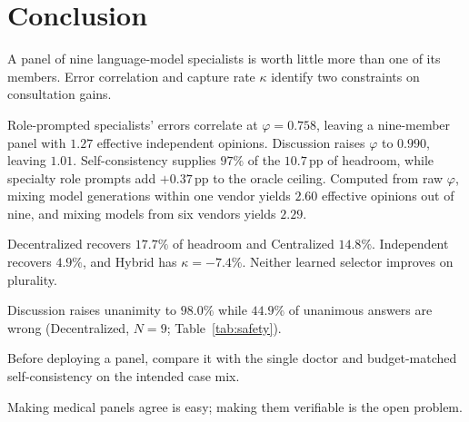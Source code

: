 \section{Conclusion}

A panel of nine language-model specialists is worth little more than one of its members. Error correlation and capture
rate $\kappa$ identify two constraints on consultation gains.

Role-prompted specialists' errors correlate at $\varphi = 0.758$, leaving a nine-member panel
with $1.27$ effective independent opinions. Discussion raises $\varphi$ to $0.990$, leaving
$1.01$. Self-consistency supplies $97\%$ of the $10.7$\,pp of headroom, while specialty role
prompts add $+0.37$\,pp to the oracle ceiling. Computed from raw $\varphi$, mixing model
generations within one vendor yields $2.60$ effective opinions out of nine, and mixing models
from six vendors yields $2.29$.

Decentralized recovers $17.7\%$ of headroom and Centralized $14.8\%$. Independent recovers
$4.9\%$, and Hybrid has $\kappa = -7.4\%$. Neither learned selector improves on plurality.

Discussion raises unanimity to $98.0\%$ while $44.9\%$ of unanimous answers are wrong
(Decentralized, $N{=}9$; Table~\ref{tab:safety}).

Before deploying a panel, compare it with the single doctor and budget-matched self-consistency
on the intended case mix.

Making medical panels agree is easy; making them verifiable is the open problem.
